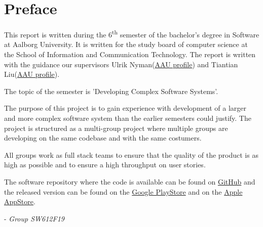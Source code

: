 \chapter*{Preface}
This report is written during the 6\textsuperscript{th} semester of the bachelor's degree in Software at Aalborg University.
It is written for the study board of computer science at the School of Information and Communication Technology.
The report is written with the guidance our supervisors Ulrik Nyman(\href{http://personprofil.aau.dk/profil/110550}{AAU profile}) and Tiantian Liu(\href{http://personprofil.aau.dk/profil/145323}{AAU profile}).

The topic of the semester is 'Developing Complex Software Systems'.

The purpose of this project is to gain experience with development of a larger and more complex software system than the earlier semesters could justify.
The project is structured as a multi-group project where multiple groups are developing on the same codebase and with the same costumers.

All groups work as full stack teams to ensure that the quality of the product is as high as possible and to ensure a high throughput on user stories.

The software repository where the code is available can be found on \href{https://github.com/aau-giraf/}{GitHub} and the released version can be found on the \href{https://play.google.com/store/apps/details?id=dk.aau.cs.giraf.weekplanner}{Google PlayStore} and on the \href{https://github.com/aau-giraf}{Apple AppStore}.

- \textit{Group SW612F19}

\newpage
